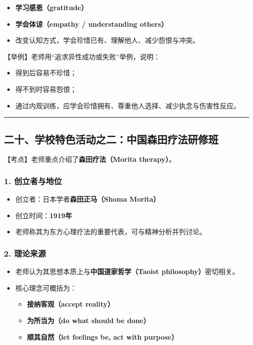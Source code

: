 \documentclass[
  chinese,
  9pt,
  a4paper,
]{ctexart}
\providecommand{\tightlist}{%
  \setlength{\itemsep}{0pt}\setlength{\parskip}{0pt}}
\begin{document}
\begin{itemize}
\tightlist
\item
  \textbf{学习感恩（gratitude）}
\item
  \textbf{学会体谅（empathy / understanding others）}
\item
  改变认知方式，学会珍惜已有、理解他人、减少怨恨与冲突。
\end{itemize}

【举例】老师用``追求异性成功或失败''举例，说明：

\begin{itemize}
\tightlist
\item
  得到后容易不珍惜；
\item
  得不到时容易怨恨；
\item
  通过内观训练，应学会珍惜拥有、尊重他人选择、减少执念与伤害性反应。
\end{itemize}

\begin{center}\rule{0.5\linewidth}{0.5pt}\end{center}

\subsection{二十、学校特色活动之二：中国森田疗法研修班}\label{ux4e8cux5341ux5b66ux6821ux7279ux8272ux6d3bux52a8ux4e4bux4e8cux4e2dux56fdux68eeux7530ux7597ux6cd5ux7814ux4feeux73ed}

【考点】老师重点介绍了\textbf{森田疗法（Morita therapy）}。

\subsubsection{1.
创立者与地位}\label{ux521bux7acbux8005ux4e0eux5730ux4f4d}

\begin{itemize}
\tightlist
\item
  创立者：日本学者\textbf{森田正马（Shoma Morita）}
\item
  创立时间：\textbf{1919年}
\item
  老师称其为东方心理疗法的重要代表，可与精神分析并列讨论。
\end{itemize}

\subsubsection{2. 理论来源}\label{ux7406ux8bbaux6765ux6e90}

\begin{itemize}
\item
  老师认为其思想本质上与\textbf{中国道家哲学（Taoist
  philosophy）}密切相关。
\item
  核心理念可概括为：

  \begin{itemize}
  \tightlist
  \item
    \textbf{接纳客观（accept reality）}
  \item
    \textbf{为所当为（do what should be done）}
  \item
    \textbf{顺其自然（let feelings be, act with purpose）}
  \end{itemize}
\end{itemize}
\end{document}
